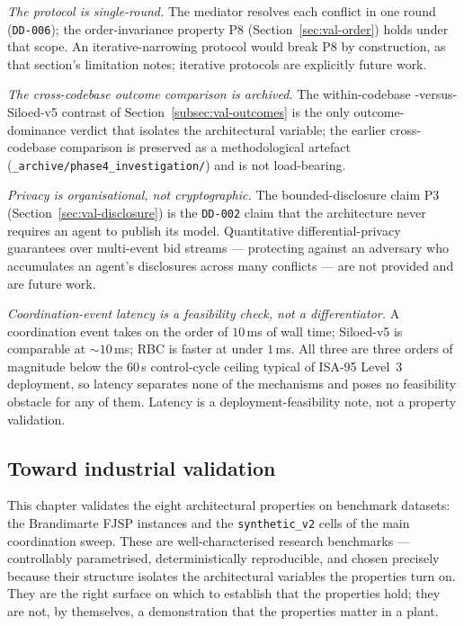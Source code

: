 \emph{The protocol is single-round.} The mediator resolves each
conflict in one round (\texttt{DD-006}); the order-invariance
property P8 (Section~\ref{sec:val-order}) holds under that scope. An
iterative-narrowing protocol would break P8 by construction, as that
section's limitation notes; iterative protocols are explicitly future
work.

\emph{The cross-codebase outcome comparison is archived.} The
within-codebase \NEXUS{}-versus-Siloed-v5 contrast of
Section~\ref{subsec:val-outcomes} is the only outcome-dominance
verdict that isolates the architectural variable; the earlier
cross-codebase comparison is preserved as a methodological artefact
(\texttt{\_archive/phase4\_investigation/}) and is not load-bearing.

\emph{Privacy is organisational, not cryptographic.} The
bounded-disclosure claim P3 (Section~\ref{sec:val-disclosure}) is the
\texttt{DD-002} claim that the architecture never requires an agent
to publish its model. Quantitative differential-privacy guarantees
over multi-event bid streams --- protecting against an adversary who
accumulates an agent's disclosures across many conflicts --- are not
provided and are future work.

\emph{Coordination-event latency is a feasibility check, not a
differentiator.} A \NEXUS{} coordination event takes on the order of
$10$\,ms of wall time; Siloed-v5 is comparable at $\sim$$10$\,ms; RBC
is faster at under $1$\,ms. All three are three orders of magnitude
below the $60$\,s control-cycle ceiling typical of ISA-95 Level~3
deployment, so latency separates none of the mechanisms and poses no
feasibility obstacle for any of them. Latency is a deployment-feasibility
note, not a property validation.

\subsection{Toward industrial validation}
\label{subsec:val-industrial}

This chapter validates the eight architectural properties on
benchmark datasets: the Brandimarte FJSP instances and the
\texttt{synthetic\_v2} cells of the main coordination sweep. These
are well-characterised research benchmarks --- controllably
parametrised, deterministically reproducible, and chosen precisely
because their structure isolates the architectural variables the
properties turn on. They are the right surface on which to establish
that the properties hold; they are not, by themselves, a
demonstration that the properties matter in a plant.

